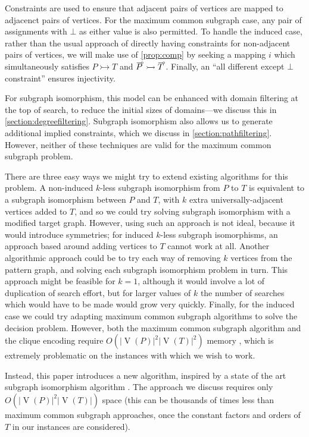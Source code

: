 \documentclass[letterpaper]{article}
\newcommand{\citep}[1]{\cite{#1}}
\theoremstyle{definition}
\newcommand{\V}{\operatorname{V}}
\newcommand{\loopcomp}[1]{\tset{\multimap}{#1}}
\newcommand{\tset}[2]{%
    \tikz[baseline=(X.base),inner sep=0pt,outer sep=0pt]{%
        \node[inner sep=0pt,outer sep=0pt] (X) {$#2$};
        \node[yshift=1.5pt,xshift=1pt] at (X.north) {$\scriptstyle#1$};
}}
\begin{document}
Constraints are used to ensure that adjacent pairs of vertices are mapped to adjacenct pairs of
vertices. For the maximum common subgraph case, any pair of assignments with $\bot$ as either value
is also permitted.  To handle the induced case, rather than the usual approach of directly
having constraints for non-adjacent pairs of vertices, we will make use of \cref{prop:comp} by
seeking a mapping $i$ which simultaneously satisfies $P \rightarrowtail T$ and $\loopcomp{P}
\rightarrowtail \loopcomp{T}$. Finally, an ``all different except $\bot$ constraint'' ensures
injectivity.

For subgraph isomorphism, this model can be enhanced with domain filtering at the top of search, to
reduce the initial sizes of domains---we discuss this in \cref{section:degreefiltering}. Subgraph
isomorphism also allows us to generate additional implied constraints, which we discuss in
\cref{section:pathfiltering}. However, neither of these techniques are valid for the maximum common
subgraph problem.

There are three easy ways we might try to extend existing algorithms for this problem.
A non-induced $k$-less subgraph isomorphism from $P$ to $T$ is equivalent to a subgraph isomorphism
between $P$ and $T$, with $k$ extra universally-adjacent vertices added to $T$, and so we could try
solving subgraph isomorphism with a modified target graph. However, using such
an approach is not ideal, because it would introduce symmetries; for induced $k$-less subgraph
isomorphisms, an approach based around adding vertices to $T$ cannot work at all.
Another algorithmic approach could be to try each way of removing $k$ vertices from the pattern
graph, and solving each subgraph isomorphism problem in turn. This approach might be feasible for $k
= 1$, although it would involve a lot of duplication of search effort, but for larger values of $k$
the number of searches which would have to be made would grow very quickly.
Finally, for the induced case we could try adapting maximum common subgraph algorithms to solve the
decision problem. However, both the maximum common subgraph algorithm and the clique encoding
require $O(\left|\V(P)\right|^2\left|\V(T)\right|^2)$ memory \citep{DBLP:conf/cp/McCreeshNPS16},
which is extremely problematic on the instances with which we wish to work.

Instead, this paper introduces a new algorithm, inspired by a state of the art subgraph isomorphism
algorithm \citep{DBLP:conf/cp/McCreeshP15}. The approach we discuss requires only
$O(\left|\V(P)\right|^2\left|\V(T)\right|)$ space (this can be thousands of times less than maximum
common subgraph approaches, once the constant factors and orders of $T$ in our instances are
considered).
\end{document}

